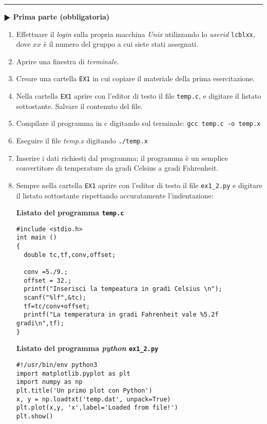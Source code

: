 \documentclass[11pt]{article}
\begin{document}
\hrule
\vspace{2mm}
\textbf{$\RHD$ Prima parte (obbligatoria)} 
\begin{enumerate}
\item Effettuare il {\em login} sulla propria macchina {\em Unix} utilizzando lo {\em userid}  \texttt{lcblxx}, dove $xx$ \`e il numero del gruppo a cui siete stati assegnati.
\item Aprire una finestra di {\em terminale}.
\item Creare una cartella  \texttt{EX1} in cui copiare il materiale della prima esercitazione.
\item Nella cartella \texttt{EX1} aprire con l'editor di testo il file \texttt{temp.c}, e digitare il listato sottostante. Salvare il contenuto del file.
\item Compilare il programma in c digitando sul terminale:
  \texttt{gcc temp.c -o temp.x}
\item Eseguire il file {\em temp.x} digitando \texttt{./temp.x}
\item Inserire i dati richiesti dal programma; il programma \`e un semplice convertitore di temperature da gradi Celsius a gradi Fahrenheit.
\item Sempre nella cartella \texttt{EX1} aprire con l'editor di testo il file \texttt{ex1\_2.py} e digitare il listato
  sottostante rispettando accuratamente l'indentazione:
\begin{mdframed}[backgroundcolor=gray!10]
  {\bf Listato del programma \texttt{temp.c}}
  \begin{verbatim}
#include <stdio.h>
int main ()
{
  double tc,tf,conv,offset;

  conv =5./9.;
  offset = 32.;
  printf("Inserisci la tempeatura in gradi Celsius \n");
  scanf("%lf",&tc);
  tf=tc/conv+offset;
  printf("La temperatura in gradi Fahrenheit vale %5.2f gradi\n",tf);
}
\end{verbatim}
\end{mdframed}

\begin{mdframed}[backgroundcolor=gray!10]
  {\bf Listato del programma {\it python} \texttt{ex1\_2.py}}
\begin{verbatim}
#!/usr/bin/env python3
import matplotlib.pyplot as plt
import numpy as np
plt.title('Un primo plot con Python')
x, y = np.loadtxt('temp.dat', unpack=True)
plt.plot(x,y, 'x',label='Loaded from file!')
plt.show()\end{verbatim}
\end{mdframed}
\end{enumerate}
\end{document}

